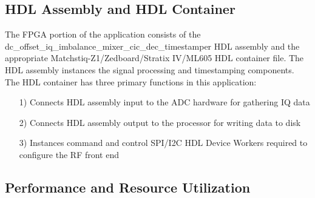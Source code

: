 \subsection{HDL Assembly and HDL Container}
The FPGA portion of the application consists of the dc\_offset\_iq\_imbalance\_mixer\_cic\_dec\_timestamper HDL assembly and the appropriate  Matchstiq-Z1/Zedboard/Stratix IV/ML605 HDL container file. The HDL assembly instances the signal processing and timestamping components. The HDL container has three primary functions in this application:
\begin{itemize}
	\item[1)] Connects HDL assembly input to the ADC hardware for gathering IQ data
	\item[2)] Connects HDL assembly output to the processor for writing data to disk
	\item[3)] Instances command and control SPI/I2C HDL Device Workers required to configure the RF front end
\end{itemize}
\begin{landscape}
\subsection{Performance and Resource Utilization}

\end{landscape}

